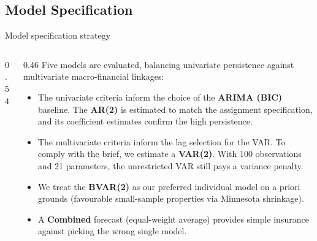 \documentclass[9pt]{beamer}
\begin{document}
\subsection{Model Specification}
\begin{frame}{Model specification strategy}
\label{slide:models}
\small

\begin{columns}
  \begin{column}{0.54\textwidth}
    {\fontsize{5}{5.5}\selectfont
    \setlength{\tabcolsep}{2.5pt}
    \setlength{\abovecaptionskip}{1pt}
    \setlength{\belowcaptionskip}{1pt}
    
    \vspace{0.1cm}
    
    \vspace{0.1cm}
    
    }
  \end{column}

  \begin{column}{0.46\textwidth}
    \footnotesize
    Five models are evaluated, balancing univariate persistence against multivariate macro-financial linkages:
    \begin{itemize}\setlength{\itemsep}{3pt}\setlength{\parskip}{0pt}
      \item The univariate criteria inform the choice of the \textbf{ARIMA (BIC)} baseline. The \textbf{AR(2)} is estimated to match the assignment specification, and its coefficient estimates confirm the high persistence.
      
      \item The multivariate criteria inform the lag selection for the VAR. To comply with the brief, we estimate a \textbf{VAR(2)}. With 100 observations and 21 parameters, the unrestricted VAR still pays a variance penalty.

      \item We treat the \textbf{BVAR(2)} as our preferred individual model on a priori grounds (favourable small-sample properties via Minnesota shrinkage).
      
      \item A \textbf{Combined} forecast (equal-weight average) provides simple insurance against picking the wrong single model.
    \end{itemize}
  \end{column}
\end{columns}

\end{frame}
\end{document}
